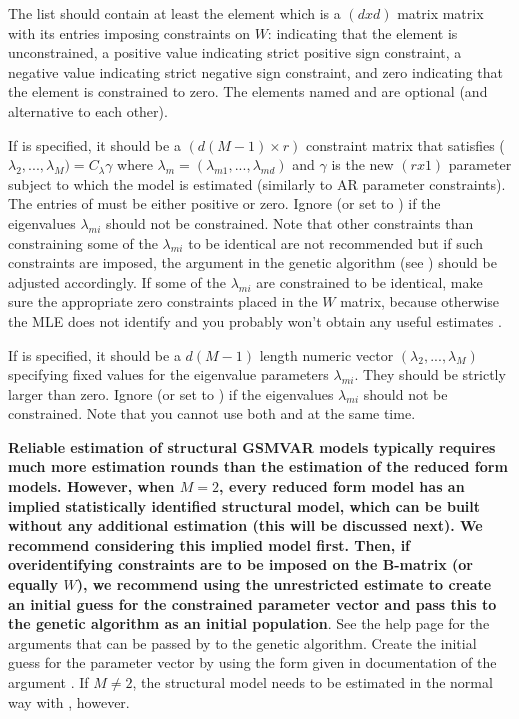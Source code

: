 \documentclass[nojss]{jss}
\begin{document}
The list  should contain at least the element  which is a $(dxd)$ matrix matrix with its entries imposing constraints on $W$:  indicating that the element is unconstrained, a positive value indicating strict positive sign constraint, a negative value indicating strict negative sign constraint, and zero indicating that the element is constrained to zero. The elements named  and  are optional (and alternative to each other).

If  is specified, it should be a $(d(M-1) \times r)$ constraint matrix that satisfies ($\lambda_{2},...,\lambda_{M}) =C_{\lambda} \gamma$ where $\lambda_{m}=(\lambda_{m1},...,\lambda_{md})$ and $\gamma$ is the new $(r x 1)$ parameter subject to which the model is estimated (similarly to AR parameter constraints). The entries of  must be either positive or zero.  Ignore (or set to ) if the eigenvalues $\lambda_{mi}$ should not be constrained. Note that other constraints than constraining some of the $\lambda_{mi}$ to be identical are not recommended but if such constraints are imposed, the argument  in the genetic algorithm (see ) should be adjusted accordingly. If some of the $\lambda_{mi}$ are constrained to be identical, make sure the appropriate zero constraints placed in the $W$ matrix, because otherwise the MLE does not identify and you probably won't obtain any useful estimates \citep[see][Proposition 2]{Virolainen2:2021}.

If  is specified, it should be a $d(M-1)$ length numeric vector $(\lambda_{2},...,\lambda_{M})$ specifying fixed values for the eigenvalue parameters $\lambda_{mi}$. They should be strictly larger than zero. Ignore (or set to ) if the eigenvalues $\lambda_{mi}$ should not be constrained. Note that you cannot use both  and  at the same time.

\textbf{Reliable estimation of structural GSMVAR models typically requires much more estimation rounds than the estimation of the reduced form models. However, when $M=2$, every reduced form model has an implied statistically identified structural model, which can be built without any additional estimation (this will be discussed next). We recommend considering this implied model first. Then, if overidentifying constraints are to be imposed on the B-matrix (or equally $W$), we recommend using the unrestricted estimate to create an initial guess for the constrained parameter vector and pass this to the genetic algorithm as an initial population}. See the help page  for the arguments that can be passed by  to the genetic algorithm. Create the initial guess for the parameter vector by using the form given in documentation of the argument . If $M\neq 2$, the structural model needs to be estimated in the normal way with , however.
\end{document}
